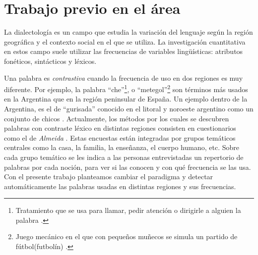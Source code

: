 




\section{Trabajo previo en el área}
La dialectología es un campo que estudia la variación del lenguaje según la región geográfica y el contexto social en el que se utiliza. La investigación cuantitativa en estos campo suele utilizar las frecuencias de variables lingüísticas: atributos fonéticos, sintácticos y léxicos.

Una palabra es \textit{contrastiva} cuando la frecuencia de uso en dos regiones es muy diferente. Por ejemplo, la palabra ``che''\footnote{Tratamiento que se usa para llamar, pedir atención o dirigirle a alguien la palabra \cite{academia2008diccionario}.}, o ``metegol''\footnote{Juego mecánico en el que con pequeños muñecos se simula un partido de fútbol(futbolín) \cite{academia2008diccionario}.} son términos más usados en la Argentina que en la región peninsular de España. Un ejemplo dentro de la Argentina, es el de ``gurisada'' conocido en el litoral y noroeste argentino como un conjunto de chicos \cite{academia2008diccionario}.
Actualmente, los métodos por los cuales se descubren palabras con contraste léxico en distintas regiones
consisten en cuestionarios como el de \emph{Almeida} \cite{almeida1995variacion}.  Estas encuestas están integradas por grupos temáticos centrales como la casa, la familia, la enseñanza, el cuerpo humano, etc. Sobre cada grupo temático se les indica a las personas entrevistadas un repertorio de palabras por cada noción, para ver si las conocen y con qué frecuencia se las usa. 
Con el presente trabajo planteamos cambiar el paradigma y detectar automáticamente las palabras usadas en distintas regiones y sus frecuencias.

